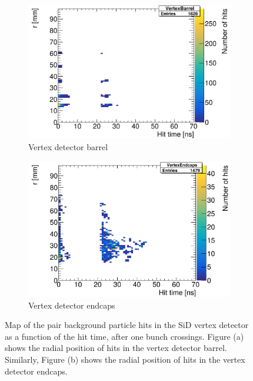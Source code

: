   \begin{figure}[h]
 \centering
  \begin{subfigure}[b]{0.49\textwidth}
   \centering
    \includegraphics[width=\textwidth]{Figures/Pairs/hittime_SiVertexBarrel.png}
   \caption{Vertex detector barrel}
   \end{subfigure}
   \hfill
    \begin{subfigure}[b]{0.49\textwidth}
   \centering
    \includegraphics[width=\textwidth]{Figures/Pairs/hittime_SiVertexEndcap.png}
   \caption{Vertex detector endcaps}
   \end{subfigure}
   \caption[Pair background hit time maps in the SiD vertex detector]{Map of the pair background particle hits in the SiD vertex detector as a function of the hit time, after one bunch crossings.
   Figure (a) shows the radial position of hits in the vertex detector barrel.
   Similarly, Figure (b) shows the radial position of hits in the vertex detector endcaps.
   }
   \label{fig:PairBkg:Hittime}
 \end{figure}
 
